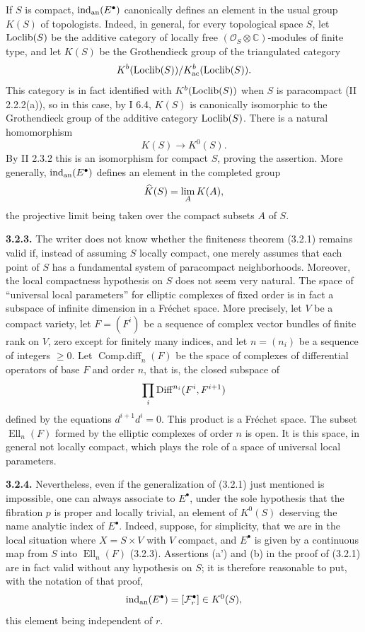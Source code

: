 \documentclass[11pt]{article}
\begin{document}
If $S$ is compact, $\operatorname{ind}_{\mathrm{an}}(E^\bullet)$ canonically defines an element in the usual group $K(S)$ of topologists. Indeed, in general, for every topological space $S$, let $\operatorname{Loclib}(S)$ be the additive category of locally free $(\mathcal O_S\otimes\mathbb C)$-modules of finite type, and let $K(S)$ be the Grothendieck group of the triangulated category
\[
 K^b(\operatorname{Loclib}(S))/K^b_{\mathrm{ac}}(\operatorname{Loclib}(S)).
\]
This category is in fact identified with $K^b(\operatorname{Loclib}(S))$ when $S$ is paracompact (II 2.2.2(a)), so in this case, by I 6.4, $K(S)$ is canonically isomorphic to the Grothendieck group of the additive category $\operatorname{Loclib}(S)$. There is a natural homomorphism
\[
 K(S)\longrightarrow K^0(S).
\]
By II 2.3.2 this is an isomorphism for compact $S$, proving the assertion. More generally, $\operatorname{ind}_{\mathrm{an}}(E^\bullet)$ defines an element in the completed group
\[
 \widehat K(S)=\operatorname*{lim}_A K(A),
\]
the projective limit being taken over the compact subsets $A$ of $S$.

\textbf{3.2.3.} The writer does not know whether the finiteness theorem (3.2.1) remains valid if, instead of assuming $S$ locally compact, one merely assumes that each point of $S$ has a fundamental system of paracompact neighborhoods. Moreover, the local compactness hypothesis on $S$ does not seem very natural. The space of ``universal local parameters'' for elliptic complexes of fixed order is in fact a subspace of infinite dimension in a Fréchet space. More precisely, let $V$ be a compact variety, let $F=(F^i)$ be a sequence of complex vector bundles of finite rank on $V$, zero except for finitely many indices, and let $n=(n_i)$ be a sequence of integers $\ge0$. Let $\operatorname{Comp.diff}_n(F)$ be the space of complexes of differential operators of base $F$ and order $n$, that is, the closed subspace of
\[
 \prod_i \operatorname{Diff}^{n_i}(F^i,F^{i+1})
\]
defined by the equations $d^{i+1}d^i=0$. This product is a Fréchet space. The subset $\operatorname{Ell}_n(F)$ formed by the elliptic complexes of order $n$ is open. It is this space, in general not locally compact, which plays the role of a space of universal local parameters.

\textbf{3.2.4.} Nevertheless, even if the generalization of (3.2.1) just mentioned is impossible, one can always associate to $E^\bullet$, under the sole hypothesis that the fibration $p$ is proper and locally trivial, an element of $K^0(S)$ deserving the name analytic index of $E^\bullet$. Indeed, suppose, for simplicity, that we are in the local situation where $X=S\times V$ with $V$ compact, and $E^\bullet$ is given by a continuous map from $S$ into $\operatorname{Ell}_n(F)$ (3.2.3). Assertions (a') and (b) in the proof of (3.2.1) are in fact valid without any hypothesis on $S$; it is therefore reasonable to put, with the notation of that proof,
\[
 \operatorname{ind}_{\mathrm{an}}(E^\bullet)=[\mathcal F_r^\bullet]\in K^0(S),
\]
this element being independent of $r$.
\end{document}
